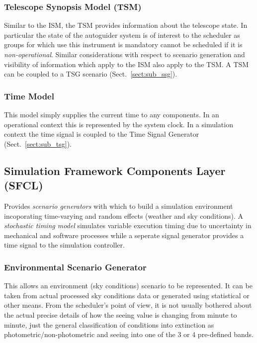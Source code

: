 \subsubsection{Telescope Synopsis Model (TSM)}
Similar to the ISM, the TSM provides information about the telescope state. In particular the state of the autoguider system is of interest to the scheduler as groups for which use this instrument is mandatory cannot be scheduled if it is \emph{non-operational}. Similar considerations with respect to scenario generation and visibility of information which apply to the ISM also apply to the TSM. A TSM can be coupled to a TSG scenario (Sect.~\ref{sect:sub_ssg}).

\subsubsection{Time Model} 
This model simply supplies the current time to any components. In an operational context this is represented by the system clock. In a simulation context the time signal is coupled to the Time Signal Generator (Sect.~\ref{sect:sub_tsg}).


\subsection{Simulation Framework Components Layer (SFCL)}
\label{sec:sub_sfcl} Provides \emph{scenario generators} with which to build a simulation environment incoporating time-varying and random effects (weather and sky conditions). A \emph{stochastic timing model} simulates variable execution timing due to uncertainty in mechanical and software processes while a seperate signal generator provides a time signal to the simulation controller.

\subsubsection{Environmental Scenario Generator}
\label{sect:sub_esg}
This allows an environment (sky conditions) scenario to be represented. It can be taken from actual processed sky conditions data or generated using statistical or other means. From the scheduler's point of view, it is not usually bothered about the actual precise details of how the seeing value is changing from minute to minute, just the general classification of conditions into extinction as photometric/non-photometric and seeing into one of the 3 or 4 pre-defined bands.

